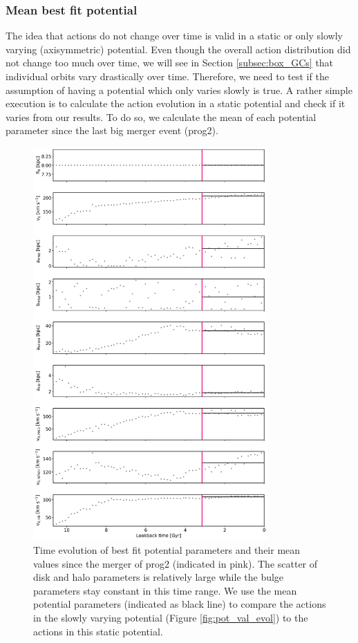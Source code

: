 \subsubsection{Mean best fit potential}\label{subsubsec:GCs_actions_time_mean_right_pot}
The idea that actions do not change over time is valid in a static or only slowly varying (axisymmetric) potential. Even though the overall action distribution did not change too much over time, we will see in Section \ref{subsec:box_GCs} that individual orbits vary drastically over time. Therefore, we need to test if the assumption of having a potential which only varies slowly is true. A rather simple execution is to calculate the action evolution in a static potential and check if it varies from our results. To do so, we calculate the mean of each potential parameter since the last big merger event (prog2). 
\begin{figure}[htbp]
\captionsetup{format=plain}
    \centering
	\includegraphics[width=0.8\textwidth]{plots/Dynamics/mean_pot/potential_evolution_with_mean_jan19.png}
    \caption{Time evolution of best fit potential parameters and their mean values since the merger of prog2 (indicated in pink). The scatter of disk and halo parameters is relatively large while the bulge parameters stay constant in this time range. We use the mean potential parameters (indicated as black line) to compare the actions in the slowly varying potential (Figure \ref{fig:pot_val_evol}) to the actions in this static potential.}\label{fig:potential_mean_evolution}
\end{figure}
